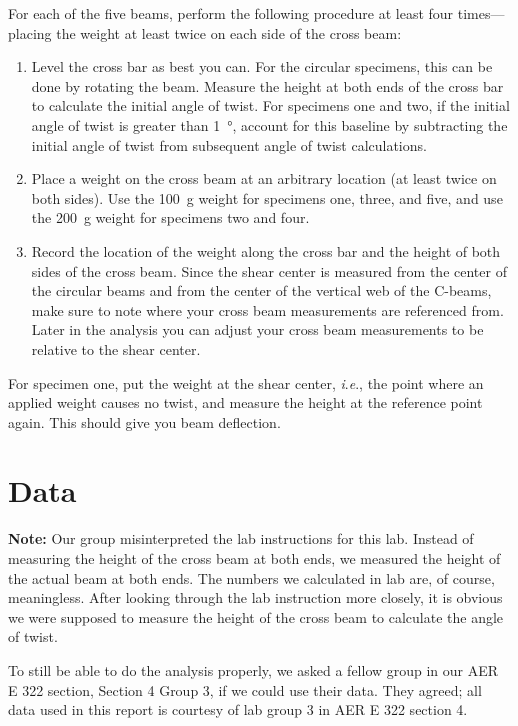 \documentclass[12 pt]{report}
\newcommand{\ie}{\textit{i}.\textit{e}., }
\begin{document}
For each of the five beams, perform the following procedure at least four times---placing the weight at least twice on each side of the cross beam:
\begin{enumerate}
	\item Level the cross bar as best you can. For the circular specimens, this can be done by rotating the beam. Measure the height at both ends of the cross bar to calculate the initial angle of twist. For specimens one and two, if the initial angle of twist is greater than \qty{1}{\degree}, account for this baseline by subtracting the initial angle of twist from subsequent angle of twist calculations.
	\item Place a weight on the cross beam at an arbitrary location (at least twice on both sides). Use the \qty{100}{\g} weight for specimens one, three, and five, and use the \qty{200}{\g} weight for specimens two and four.
	\item Record the location of the weight along the cross bar and the height of both sides of the cross beam. Since the shear center is measured from the center of the circular beams and from the center of the vertical web of the C-beams, make sure to note where your cross beam measurements are referenced from. Later in the analysis you can adjust your cross beam measurements to be relative to the shear center.
\end{enumerate}

For specimen one, put the weight at the shear center, \ie the point where an applied weight causes no twist, and measure the height at the reference point again. This should give you beam deflection.

\section{Data} \label{data}
\textbf{Note:} Our group misinterpreted the lab instructions for this lab. Instead of measuring the height of the cross beam at both ends, we measured the height of the actual beam at both ends. The numbers we calculated in lab are, of course, meaningless. After looking through the lab instruction more closely, it is obvious we were supposed to measure the height of the cross beam to calculate the angle of twist.

To still be able to do the analysis properly, we asked a fellow group in our AER E 322 section, Section \num{4} Group \num{3}, if we could use their data. They agreed; all data used in this report is courtesy of lab group \num{3} in AER E 322 section \num{4}.
\end{document}
